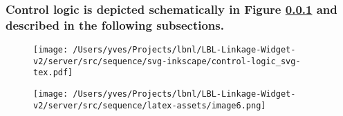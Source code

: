 \documentclass[10pt]{article}
\begin{document}
\subsubsection{Control logic is depicted schematically in Figure \ref{figure:control_logic} and described in the following subsections.} \label{figure:control_logic}

\begin{figure}[h]
  \texttt{[image: /Users/yves/Projects/lbnl/LBL-Linkage-Widget-v2/server/src/sequence/svg-inkscape/control-logic\_svg-tex.pdf]}
%  
\end{figure}

\begin{figure}[h]
  \texttt{[image: /Users/yves/Projects/lbnl/LBL-Linkage-Widget-v2/server/src/sequence/latex-assets/image6.png]}
\end{figure}

\ifdefined\BuildingsTemplatesAirHandlersFansInterfacesPartialAirHandlertypFanRet
\fi
\end{document}
